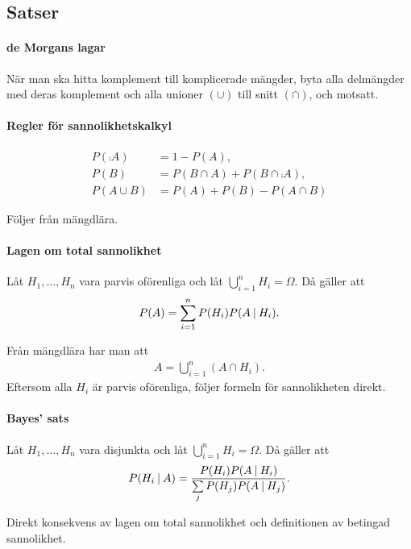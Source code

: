\subsection{Satser}

\paragraph{de Morgans lagar}
När man ska hitta komplement till komplicerade mängder, byta alla delmängder med deras komplement och alla unioner $(\cup)$ till snitt $(\cap)$, och motsatt.

\paragraph{Regler för sannolikhetskalkyl}
\begin{align*}
	P(\comp{A}) &= 1 - P(A), \\
	P(B)        &= P(B\cap A) + P(B\cap\comp{A}), \\
	P(A\cup B)  &= P(A) + P(B) - P(A\cap B)
\end{align*}

\proof
Följer från mängdlära.

\paragraph{Lagen om total sannolikhet}
Låt $H_1, \dots, H_n$ vara parvis oförenliga och låt $\bigcup\limits_{i = 1}^{n}H_i = \Omega$. Då gäller att
\begin{align*}
	P(A) = \sum\limits_{i = 1}^{n}P(H_i)P(A\:\vert\: H_i).
\end{align*}

\proof
Från mängdlära har man att
\begin{align*}
	A = \bigcup\limits_{i = 1}^{n}(A\cap H_i).
\end{align*}
Eftersom alla $H_i$ är parvis oförenliga, följer formeln för sannolikheten direkt.

\paragraph{Bayes' sats}
Låt $H_1, \dots, H_n$ vara disjunkta och låt $\bigcup\limits_{i = 1}^{n}H_i = \Omega$. Då gäller att
\begin{align*}
	P(H_i\:\vert\: A) = \frac{P(H_i)P(A\:\vert\: H_i)}{\sum\limits_{j} P(H_j)P(A\:\vert\: H_j)}.
\end{align*}

\proof
Direkt konsekvens av lagen om total sannolikhet och definitionen av betingad sannolikhet.

